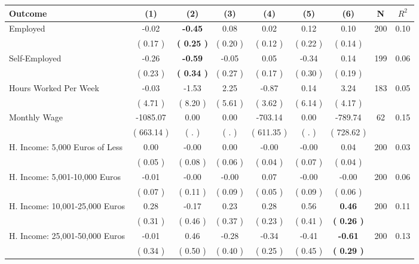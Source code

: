 \begin{tabular}{lcccccccc}
\toprule
 \textbf{Outcome} & \textbf{(1)} & \textbf{(2)} & \textbf{(3)} & \textbf{(4)} & \textbf{(5)} & \textbf{(6)} & \textbf{N} & \textbf{$ R^2$} \\
\midrule
Employed &     -0.02 & \textbf{    -0.45} &      0.08 &      0.02 &      0.12 &      0.10 & 200 &       0.10 \\ 
 & (     0.17 ) & \textbf{(     0.25 )} & (     0.20 ) & (     0.12 ) & (     0.22 ) & (     0.14 ) & \\
Self-Employed &     -0.26 & \textbf{    -0.59} &     -0.05 &      0.05 &     -0.34 &      0.14 & 199 &       0.06 \\ 
 & (     0.23 ) & \textbf{(     0.34 )} & (     0.27 ) & (     0.17 ) & (     0.30 ) & (     0.19 ) & \\
Hours Worked Per Week &     -0.03 &     -1.53 &      2.25 &     -0.87 &      0.14 &      3.24 & 183 &       0.05 \\ 
 & (     4.71 ) & (     8.20 ) & (     5.61 ) & (     3.62 ) & (     6.14 ) & (     4.17 ) & \\
Monthly Wage &  -1085.07 &      0.00 &      0.00 &   -703.14 &      0.00 &   -789.74 & 62 &       0.15 \\ 
 & (   663.14 ) & (        . ) & (        . ) & (   611.35 ) & (        . ) & (   728.62 ) & \\
H. Income: 5,000 Euros of Less &      0.00 &     -0.00 &      0.00 &     -0.00 &     -0.00 &      0.04 & 200 &       0.03 \\ 
 & (     0.05 ) & (     0.08 ) & (     0.06 ) & (     0.04 ) & (     0.07 ) & (     0.04 ) & \\
H. Income: 5,001-10,000 Euros &     -0.01 &     -0.00 &     -0.00 &      0.07 &     -0.00 &     -0.00 & 200 &       0.06 \\ 
 & (     0.07 ) & (     0.11 ) & (     0.09 ) & (     0.05 ) & (     0.09 ) & (     0.06 ) & \\
H. Income: 10,001-25,000 Euros &      0.28 &     -0.17 &      0.23 &      0.28 &      0.56 & \textbf{     0.46} & 200 &       0.11 \\ 
 & (     0.31 ) & (     0.46 ) & (     0.37 ) & (     0.23 ) & (     0.41 ) & \textbf{(     0.26 )} & \\
H. Income: 25,001-50,000 Euros &     -0.01 &      0.46 &     -0.28 &     -0.34 &     -0.41 & \textbf{    -0.61} & 200 &       0.13 \\ 
 & (     0.34 ) & (     0.50 ) & (     0.40 ) & (     0.25 ) & (     0.45 ) & \textbf{(     0.29 )} & \\

\end{tabular}
